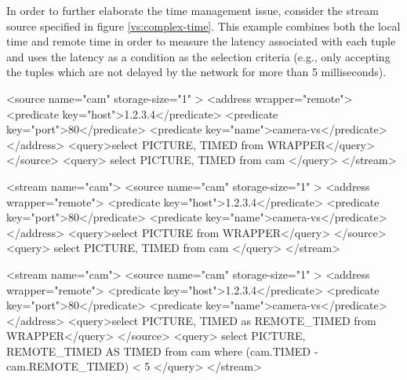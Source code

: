 In order to further elaborate the time management issue, consider the stream source specified in figure \ref{vs:complex-time}. This example combines both
the local time and remote time in order to measure the latency associated with each tuple and uses the latency as a condition as the selection
criteria (e.g., only accepting the tuples which are not delayed by the network for more than 5 milliseconds).

\begin{xmlcode}[caption={A stream using the remote timestamp.}, label=vs:police]
   <source name="cam"  storage-size="1" >
      <address wrapper="remote">
         <predicate key="host">1.2.3.4</predicate>
         <predicate key="port">80</predicate>
         <predicate key="name">camera-vs</predicate>
      </address>
      <query>select PICTURE, TIMED from WRAPPER</query>
   </source>
	 <query>
      select PICTURE, TIMED from cam
   </query>
</stream>
\end{xmlcode}

\begin{xmlcode}[caption={A stream using the local (arrival) timestamp.}, label=vs:insurance]
<stream name="cam">
   <source name="cam"  storage-size="1" >
      <address wrapper="remote">
         <predicate key="host">1.2.3.4</predicate>
         <predicate key="port">80</predicate>
         <predicate key="name">camera-vs</predicate>
      </address>
      <query>select PICTURE from WRAPPER</query>
   </source>
   <query>
      select PICTURE, TIMED from cam
   </query>
</stream>
\end{xmlcode}

\begin{xmlcode}[caption={A stream using both local and remote timestamps.}, label=vs:complex-time]
<stream name="cam">
   <source name="cam"  storage-size="1" >
      <address wrapper="remote">
         <predicate key="host">1.2.3.4</predicate>
         <predicate key="port">80</predicate>
         <predicate key="name">camera-vs</predicate>
      </address>
      <query>select PICTURE, TIMED as REMOTE_TIMED from WRAPPER</query>
   </source>
   <query>
      select PICTURE, REMOTE_TIMED AS TIMED from cam where 
      (cam.TIMED - cam.REMOTE_TIMED) < 5
   </query>
</stream>
\end{xmlcode}

